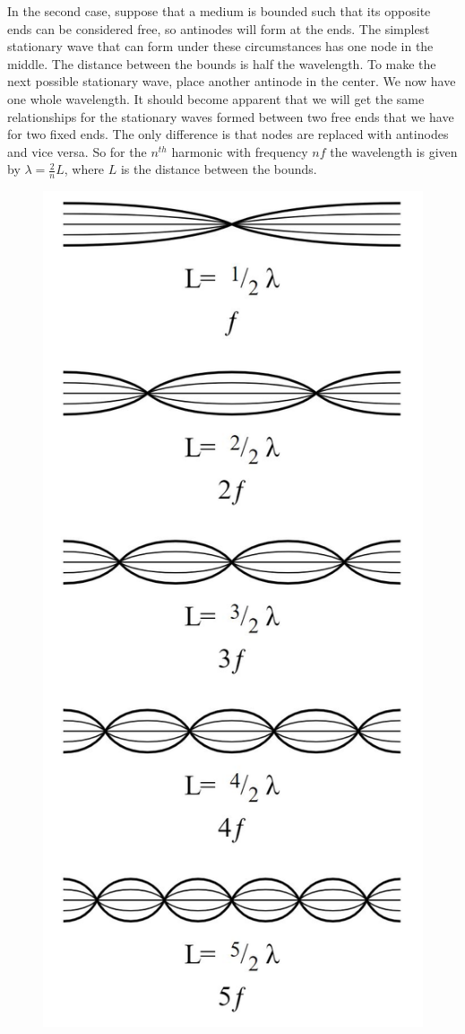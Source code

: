 In the second case, suppose that a medium is bounded such that its opposite ends can be considered free, so antinodes will form at the ends. The simplest stationary wave that can form under these circumstances has one node in the middle. The distance between the bounds is half the wavelength. To make the next possible stationary wave, place another antinode in the center. We now have one whole wavelength. It should become apparent that we will get the same relationships for the stationary waves formed between two free ends that we have for two fixed ends. The only difference is that nodes are replaced with antinodes and vice versa. So for the $n^{th}$ harmonic with frequency $nf$ the wavelength is given by $\lambda = \frac{2}{n} L$, where $L$ is the distance between the bounds. 

\begin{figure}[h!]
    \centering
    \includegraphics[scale=0.5]{notes/images/Harmonic-2.JPG}

\end{figure}
